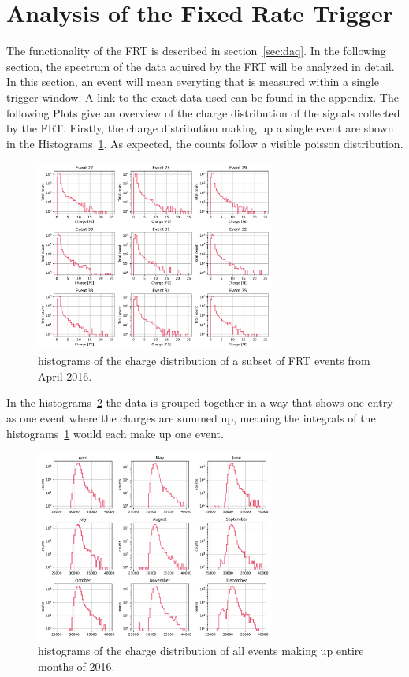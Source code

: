 \section{Analysis of the Fixed Rate Trigger}

The functionality of the FRT is described in section~\ref{sec:daq}. In the following section, the spectrum of the data aquired by the FRT will be analyzed in 
detail. In this section, an event will mean everyting that is measured within a single trigger window. A link to the exact data used can be found 
in the appendix. The following Plots give an overview of the charge distribution of the signals collected by the FRT. Firstly, the charge distribution making up a 
single event are shown in the Histograms~\ref{fig:single_charge_hist}. As expected, the counts follow a visible poisson distribution.

\begin{figure}
    \centering
    \includegraphics[width=0.7\textwidth]{Plots/single_charge_hist.pdf}
    \caption{histograms of the charge distribution of a subset of FRT events from April 2016.}
    \label{fig:single_charge_hist}
\end{figure}


In the histograms~\ref{fig:monthly_charge_hist} the data is grouped together in a way that shows one entry as one event where the charges are summed up, meaning the 
integrals of the histograms~\ref{fig:single_charge_hist} would each make up one event. 

\begin{figure}
    \centering
    \includegraphics[width=0.7\textwidth]{Plots/monthly_charge_hist.pdf}
    \caption{histograms of the charge distribution of all events making up entire months of 2016.}
    \label{fig:monthly_charge_hist}
\end{figure}

